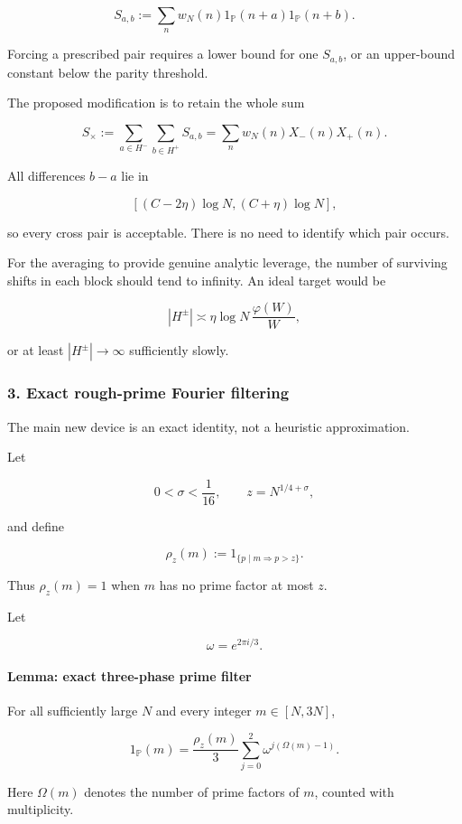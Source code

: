 \[
S_{a,b}:=
\sum_n w_N(n)
1_{\mathbb P}(n+a)1_{\mathbb P}(n+b).
\]

Forcing a prescribed pair requires a lower bound for one \(S_{a,b}\), or an upper-bound constant below the parity threshold.

The proposed modification is to retain the whole sum

\[
S_\times
:=
\sum_{a\in H^-}\sum_{b\in H^+}S_{a,b}
=
\sum_n w_N(n)X_-(n)X_+(n).
\tag{5}
\]

All differences \(b-a\) lie in

\[
[(C-2\eta)\log N,(C+\eta)\log N],
\]

so every cross pair is acceptable. There is no need to identify which pair occurs.

For the averaging to provide genuine analytic leverage, the number of surviving shifts in each block should tend to infinity. An ideal target would be

\[
|H^\pm|
\asymp
\eta\log N\,\frac{\varphi(W)}{W},
\]

or at least \(|H^\pm|\to\infty\) sufficiently slowly.

\medskip
\medskip


\subsubsection*{3. Exact rough-prime Fourier filtering}

The main new device is an exact identity, not a heuristic approximation.

Let

\[
0<\sigma<\frac1{16},
\qquad
z=N^{1/4+\sigma},
\]

and define

\[
\rho_z(m):=
1_{\{p\mid m\Rightarrow p>z\}}.
\]

Thus \(\rho_z(m)=1\) when \(m\) has no prime factor at most \(z\).

Let

\[
\omega=e^{2\pi i/3}.
\]

\paragraph{Lemma: exact three-phase prime filter}

For all sufficiently large \(N\) and every integer \(m\in[N,3N]\),

\[
\boxed{
1_{\mathbb P}(m)
=
\frac{\rho_z(m)}3
\sum_{j=0}^{2}\omega^{j(\Omega(m)-1)}.
}
\tag{6}
\]

Here \(\Omega(m)\) denotes the number of prime factors of \(m\), counted with multiplicity.

